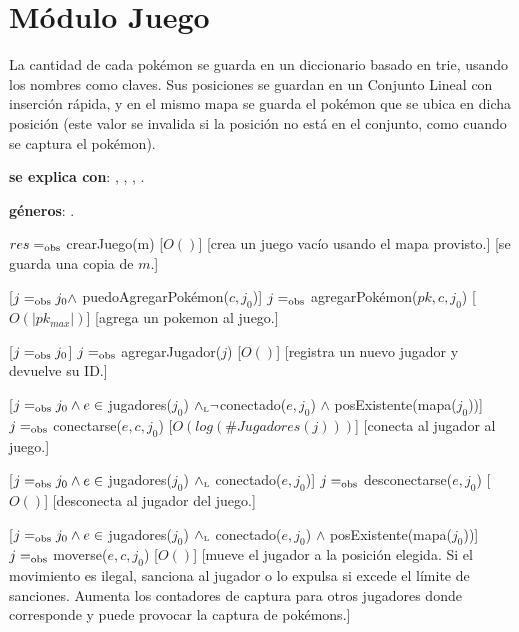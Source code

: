 \section{Módulo Juego}

La cantidad de cada pokémon se guarda en un diccionario basado en trie, usando los nombres como claves. Sus posiciones se guardan en un Conjunto Lineal con inserción rápida, y en el mismo mapa se guarda el pokémon que se ubica en dicha posición (este valor se invalida si la posición no está en el conjunto, como cuando se captura el pokémon). 

\begin{Interfaz}

	\textbf{se explica con}: , , , .

	\textbf{géneros}: .


	{$res =_{\mathrm{obs}}$ crearJuego(m)}
	[$O()$]
	[crea un juego vacío usando el mapa provisto.]
	[se guarda una copia de $m$.]

	[$j =_{\mathrm{obs}} j_0 \land$ puedoAgregarPokémon($c,j_0$)]
	{$j =_{\mathrm{obs}}$ agregarPokémon($pk, c, j_0$)}
	[$O(|pk_{max}|)$]
	[agrega un pokemon al juego.]

	[$j =_{\mathrm{obs}} j_0$]
	{$j =_{\mathrm{obs}}$ agregarJugador($j$)}
	[$O()$]
	[registra un nuevo jugador y devuelve su ID.]

	[$j =_{\mathrm{obs}} j_0 \land e \in$ jugadores($j_0$) $\land_{\mathrm{\scriptscriptstyle{L}}} \neg$conectado($e,j_0$) $\land$ posExistente(mapa($j_0$))]
	{$j =_{\mathrm{obs}}$ conectarse($e, c, j_0$)}
	[$O(log(\#Jugadores(j)))$]
	[conecta al jugador al juego.]

	[$j =_{\mathrm{obs}} j_0 \land e \in$ jugadores($j_0$) $\land_{\mathrm{\scriptscriptstyle{L}}}$ conectado($e,j_0$)]
	{$j =_{\mathrm{obs}}$ desconectarse($e, j_0$)}
	[$O()$]
	[desconecta al jugador del juego.]

	[$j =_{\mathrm{obs}} j_0 \land e \in$ jugadores($j_0$) $\land_{\mathrm{\scriptscriptstyle{L}}}$ conectado($e,j_0$) $\land$ posExistente(mapa($j_0$))]
	{$j =_{\mathrm{obs}}$ moverse($e, c, j_0$)}
	[$O()$]
	[mueve el jugador a la posición elegida. Si el movimiento es ilegal, sanciona al jugador o lo expulsa si excede el límite de sanciones. Aumenta los contadores de captura para otros jugadores donde corresponde y puede provocar la captura de pokémons.]


\end{Interfaz}
